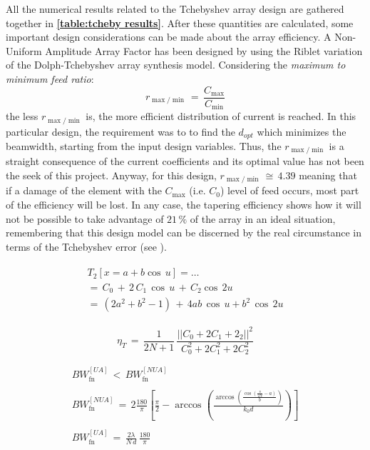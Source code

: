 \documentclass[10 pt,a4paper,twocolumn]{article}
\begin{document}
{\indent 

All the numerical results related to the Tchebyshev array design are gathered together in \textbf{\cref{table:tcheby results}}. After these quantities are calculated, some important design considerations can be made about the array efficiency. A Non-Uniform Amplitude Array Factor has been designed by using the Riblet variation of the Dolph-Tchebyshev array synthesis model. Considering the \emph{maximum to minimum feed ratio}: \[r_{\max/\min}\,=\,\frac{C_{\max}}{C_{\min}}\] 
the less $r_{\max/\min}$ is, the more efficient distribution of current is reached. In this particular design, the requirement was to to find the $d_{opt}$ which minimizes the beamwidth, starting from the input design variables. Thus, the $r_{\max/\min}$ is a straight consequence of the current coefficients and its optimal value has not been the seek of this project. Anyway, for this design, $r_{\max/\min}\,\cong\,4.39$ meaning that if a damage of the element with the $C_{\max}$ (i.e. $C_0$) level of feed occurs, most part of the efficiency will be lost. In any case, the tapering efficiency shows how it will not be possible to take advantage of $21\,\%$ of the array in an ideal situation, remembering that this design model can be discerned by the real circumstance in terms of the Tchebyshev error (see \textbf{\cite{Balanis1}}). 

\begin{equation}\begin{split}
		\begin{aligned}
			T_2\left[x=a+b\cos\,u\right]=\dots\\
			=\,C_0\,+\,2\,C_1\,\cos\,u\,+\,C_2\cos\,2u\\
			=\,(2a^2+b^2-1)\,+\,4ab\,\cos\,u+b^2\,\cos\,2u
			\label{eq:tcheby poly coeff}
		\end{aligned}
	\end{split}
\end{equation}

\begin{equation}
	\eta_T\,=\,\frac{1}{2N+1}\,\frac{||C_0+2C_1+2_2||^2}{C_0^2+2C_1^2+2C_2^2}
	\label{eq:tapering efficiency}
\end{equation}

\begin{equation}
	\begin{gathered}
		BW_{\operatorname{fn}}^{[UA]}\,{<}\,BW_{\operatorname{fn}}^{[NUA]}\\
		\\
		BW_{\operatorname{fn}}^{[NUA]}\,{=}\,2\frac{180}{\pi}\left[\frac{\pi}{2}-\arccos\left(\frac{\arccos\left(\frac{\cos\left(\frac{\pi}{2N}-a\right)}{b}\right)}{k_0d}\right)\right]\\
		\\
		BW_{\operatorname{fn}}^{[UA]}\,{=}\,\frac{2\lambda}{N\,d}\,\frac{180}{\pi}
	\end{gathered}
	\label{eq:tcheby beamwidth}
\end{equation}

}
\end{document}
